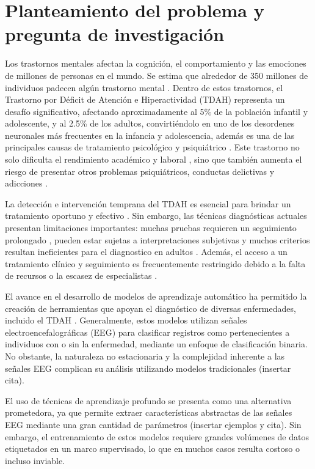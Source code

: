 
\section{Planteamiento del problema y pregunta de investigación}

Los trastornos mentales afectan la cognición, el comportamiento y las emociones de millones de personas en el mundo. Se estima que alrededor de 350 millones de individuos padecen algún trastorno mental \cite{Dehghan-Bonari2023}. Dentro de estos trastornos, el Trastorno por Déficit de Atención e Hiperactividad (TDAH) representa un desafío significativo, afectando aproximadamente al 5\% de la población infantil y adolescente, y al 2.5\% de los adultos, convirtiéndolo en uno de los desordenes neuronales más frecuentes en la infancia y adolescencia, además es una de las principales causas de tratamiento psicológico y psiquiátrico \cite{Salari2023}. Este trastorno no solo dificulta el rendimiento académico y laboral \cite{Ayano2020}, sino que también aumenta el riesgo de presentar otros problemas psiquiátricos, conductas delictivas y adicciones \cite{Faraone2015}.

La detección e intervención temprana del TDAH es esencial para brindar un tratamiento oportuno y efectivo \cite{Kivumbi2019}. Sin embargo, las técnicas diagnósticas actuales presentan limitaciones importantes: muchas pruebas requieren un seguimiento prolongado \cite{Zhou2015-bg}, pueden estar sujetas a interpretaciones subjetivas \cite{LOHANI2023111689} y muchos criterios resultan ineficientes para el diagnostico en adultos \cite{Sibley21042021}. Además, el acceso a un tratamiento clínico y seguimiento es frecuentemente restringido debido a la falta de recursos o la escasez de especialistas \cite{Asherson2022,Pallanti2020}.

El avance en el desarrollo de modelos de aprendizaje automático ha permitido la creación de herramientas que apoyan el diagnóstico de diversas enfermedades, incluido el TDAH \cite{article}. Generalmente, estos modelos utilizan señales electroencefalográficas (EEG) para clasificar registros como pertenecientes a individuos con o sin la enfermedad, mediante un enfoque de clasificación binaria. No obstante, la naturaleza no estacionaria y la complejidad inherente a las señales EEG complican su análisis utilizando modelos tradicionales (insertar cita).

El uso de técnicas de aprendizaje profundo se presenta como una alternativa prometedora, ya que permite extraer características abstractas de las señales EEG mediante una gran cantidad de parámetros (insertar ejemplos y cita). Sin embargo, el entrenamiento de estos modelos requiere grandes volúmenes de datos etiquetados en un marco supervisado, lo que en muchos casos resulta costoso o incluso inviable.

